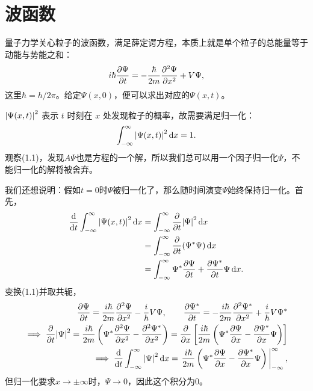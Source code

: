 \newpage
\section{波函数}

量子力学关心粒子的波函数，满足薛定谔方程，本质上就是单个粒子的总能量等于动能与势能之和：
\begin{equation}
    i\hbar\pdv{\Psi}{t} = -\frac{\hbar}{2m} \pdv[2]{\Psi}{x} + V\Psi,
\end{equation}
这里$\hbar=h/2\pi$。给定$\Psi(x,0)$，便可以求出对应的$\Psi(x,t)$。

$\abs{\Psi(x,t)}^2$ 表示 $t$ 时刻在 $x$ 处发现粒子的概率，故需要满足归一化：
\begin{equation}
    \int_{-\infty}^\infty \abs{\Psi(x,t)}^2\,\dd x = 1.
\end{equation}
观察(1.1)，发现$A\Psi$也是方程的一个解，所以我们总可以用一个因子归一化$\Psi$，不能归一化的解将被舍弃。

我们还想说明：假如\(t=0\)时\(\Psi\)被归一化了，那么随时间演变\(\Psi\)始终保持归一化。首先，
\begin{equation}
    \begin{split}
        \dv{t}\int_{-\infty}^\infty \abs{\Psi(x,t)}^2 \, \dd x &= \int_{-\infty}^\infty \pdv{t}\abs{\Psi}^2\,\dd x\\
        &=\int_{-\infty}^\infty \pdv{t}(\Psi^*\Psi)\,\dd x\\
        &=\int_{-\infty}^\infty \Psi^*\pdv{\Psi}{t} + \pdv{\Psi^*}{t}\Psi \,\dd x.
    \end{split}
\end{equation}
变换(1.1)并取共轭，
\begin{eqnarray}
    \pdv{\Psi}{t} = \frac{i\hbar}{2m} \pdv[2]{\Psi}{x} - \frac{i}{\hbar}V\Psi, \qquad \pdv{\Psi^*}{t} = -\frac{i\hbar}{2m} \pdv[2]{\Psi^*}{x} + \frac{i}{\hbar}V\Psi^* \\
    \implies \pdv{t}\abs{\Psi}^2 = \frac{i\hbar}{2m}\left(\Psi^*\pdv[2]{\Psi}{x}-\pdv[2]{\Psi^*}{x}\right) = \pdv{x}\left[\frac{i\hbar}{2m}\left(\Psi^*\pdv{\Psi}{x}-\pdv{\Psi^*}{x}\Psi\right)\right]\\
    \implies \dv{t}\int_{-\infty}^{\infty}\abs{\Psi}^2\,\dd x = \eval{\frac{i\hbar}{2m}\left(\Psi^*\pdv{\Psi}{x}-\pdv{\Psi^*}{x}\Psi\right)}_{-\infty}^{\infty},
\end{eqnarray}
但归一化要求\(x\to\pm \infty\)时，\(\Psi\to0\)，因此这个积分为\(0\)。

